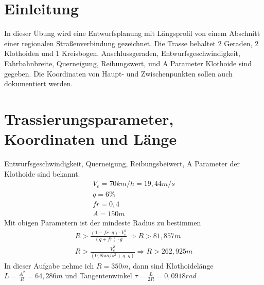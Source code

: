 \documentclass[12pt]{article}
\begin{document}
	\pagestyle{main}
\tableofcontents
\newpage
\section{Einleitung}
In dieser Übung wird eine Entwurfsplanung mit Längsprofil von einem Abschnitt einer regionalen Straßenverbindung gezeichnet. Die Trasse behaltet 2 Geraden, 2 Klothoiden und 1 Kreisbogen. Anschlussgeraden, Entwurfsgeschwindigkeit, Fahrbahnbreite, Querneigung, Reibungswert, und A Parameter Klothoide sind gegeben. Die Koordinaten von Haupt- und Zwischenpunkten sollen auch dokumentiert werden. 
\newpage
\section{Trassierungsparameter, Koordinaten und Länge}
Entwurfsgeschwindigkeit, Querneigung, Reibungsbeiwert, A Parameter der Klothoide sind bekannt.
\begin{gather*}
V_e  = 70 km/h = 19,44m/s \\
q = 6\% \\
fr = 0,4 \\ 
A = 150m 
\end{gather*}
Mit obigen Parametern ist der mindeste Radius zu bestimmen
\begin{gather*}
R > \frac{(1 - fr \cdot q) \cdot V_e^2}{(q + fr) \cdot g} \Rightarrow R > 81,857m \\
R > \frac{V_e^2}{(0,85m/s^2 + g \cdot q)} \Rightarrow R > 262,925m 
\end{gather*}
In dieser Aufgabe nehme ich $R = 350 m$, dann sind Klothoidelänge $L = \frac{A^2}{R} = 64,286m$ und Tangentenwinkel $\tau = \frac{L}{2R} = 0,0918 rad$ \newline
\begin{figure}[ht]\centering
\end{figure}
\end{document}
